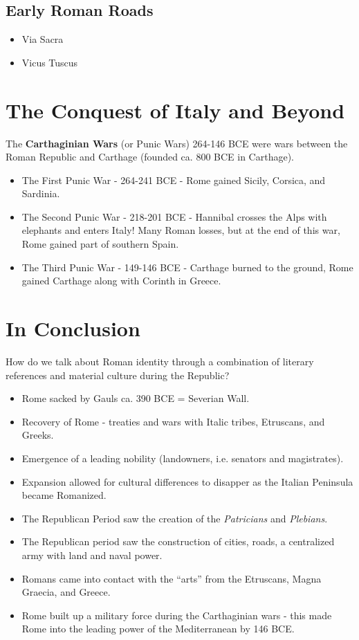 \documentclass{article}
\begin{document}
\subsection{Early Roman Roads}
\begin{itemize}
\item Via Sacra
\item Vicus Tuscus
\end{itemize}
\section{The Conquest of Italy and Beyond}
The \textbf{Carthaginian Wars} (or Punic Wars) 264-146 BCE were wars between the Roman Republic and Carthage (founded ca. 800 BCE in Carthage).
\begin{itemize}
\item The First Punic War - 264-241 BCE - Rome gained Sicily, Corsica, and Sardinia.
\item The Second Punic War - 218-201 BCE - Hannibal crosses the Alps with elephants and enters Italy!  Many Roman losses, but at the end of this war, Rome gained part of southern Spain.
\item The Third Punic War - 149-146 BCE - Carthage burned to the ground, Rome gained Carthage along with Corinth in Greece.
\end{itemize}
\section{In Conclusion}
How do we talk about Roman identity through a combination of literary references and material culture during the Republic?
\begin{itemize}
\item Rome sacked by Gauls ca. 390 BCE = Severian Wall.
\item Recovery of Rome - treaties and wars with Italic tribes, Etruscans, and Greeks.
\item Emergence of a leading nobility (landowners, i.e. senators and magistrates).
\item Expansion allowed for cultural differences to disapper as the Italian Peninsula became Romanized.
\item The Republican Period saw the creation of the \textit{Patricians} and \textit{Plebians}.
\item The Republican period saw the construction of cities, roads, a centralized army with land and naval power.
\item Romans came into contact with the ``arts'' from the Etruscans, Magna Graecia, and Greece.
\item Rome built up a military force during the Carthaginian wars - this made Rome into the leading power of the Mediterranean by 146 BCE.
\end{itemize}
\end{document}
